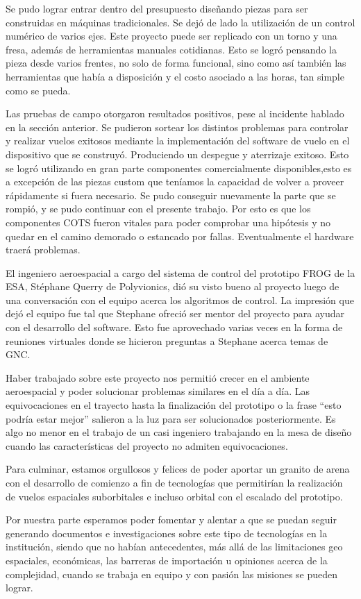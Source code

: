 Se pudo lograr entrar dentro del presupuesto diseñando piezas para ser construidas en máquinas tradicionales. Se dejó de lado la utilización de un control numérico de varios ejes. Este proyecto puede ser replicado con un torno y una fresa, además de herramientas manuales cotidianas. Esto se logró pensando la pieza desde varios frentes, no solo de forma funcional, sino como así también las herramientas que había a disposición y el costo asociado a las horas, tan simple como se pueda.

Las pruebas de campo otorgaron resultados positivos, pese al incidente hablado en la sección anterior. Se pudieron sortear los distintos problemas para controlar y realizar vuelos exitosos mediante la implementación del software de vuelo en el dispositivo que se construyó. Produciendo un despegue y aterrizaje exitoso. Esto se logró utilizando en gran parte componentes comercialmente disponibles,esto es a excepción de las piezas custom que teníamos la capacidad de volver a proveer rápidamente si fuera necesario. Se pudo conseguir nuevamente la parte que se rompió, y se pudo continuar con el presente trabajo. Por esto es que los componentes COTS fueron vitales para poder comprobar una hipótesis y no quedar en el camino demorado o estancado por fallas. Eventualmente el hardware traerá problemas.

El ingeniero aeroespacial a cargo del sistema de control del prototipo FROG de la ESA, Stéphane Querry de Polyvionics, dió su visto bueno al proyecto luego de una conversación con el equipo acerca los algoritmos de control. La impresión que dejó el equipo fue tal que Stephane ofreció ser mentor del proyecto para ayudar con el desarrollo del software. Esto fue aprovechado varias veces en la forma de reuniones virtuales donde se hicieron preguntas a Stephane acerca temas de GNC.

\medskip

Haber trabajado sobre este proyecto nos permitió crecer en el ambiente aeroespacial y poder solucionar problemas similares en el día a día. Las equivocaciones en el trayecto hasta la finalización del prototipo o la frase “esto podría estar mejor” salieron a la luz para ser solucionados posteriormente. Es algo no menor en el trabajo de un casi ingeniero trabajando en la mesa de diseño cuando las características del proyecto no admiten equivocaciones.

Para culminar, estamos orgullosos y felices de poder aportar un granito de arena con el desarrollo de comienzo a fin de tecnologías que permitirían la realización de vuelos espaciales suborbitales e incluso orbital con el escalado del prototipo.

Por nuestra parte esperamos poder fomentar y alentar a que se puedan seguir generando documentos e investigaciones sobre este tipo de tecnologías en la institución, siendo que no habían antecedentes, más allá de las limitaciones geo espaciales, económicas, las barreras de importación u opiniones acerca de la complejidad, cuando se trabaja en equipo y con pasión las misiones se pueden lograr.
